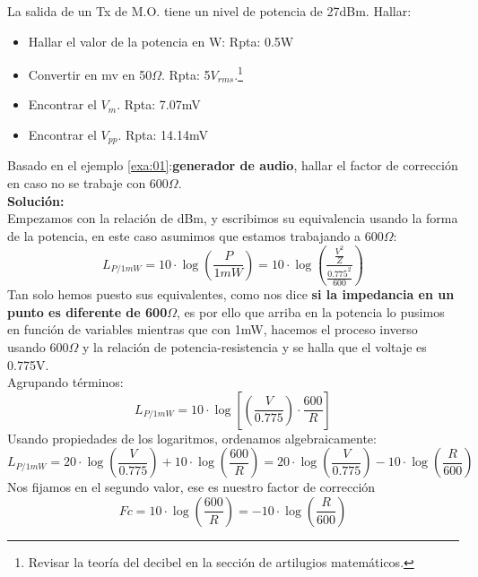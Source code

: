 \documentclass[
	12pt, %
	fleqn, %
	a4paper, %
	oneside, %
]{LegrandOrangeBook}
\begin{document}
\begin{exercise}
La salida de un Tx de M.O. tiene un nivel de potencia de 27dBm. Hallar:
\begin{itemize}
\item Hallar el valor de la potencia en W: Rpta: 0.5W
\item Convertir en mv en 50$\Omega$. Rpta: 5$V_{rms}$.\footnote{Revisar la teoría del decibel en la sección de artilugios matemáticos.}
\item Encontrar el $V_m$. Rpta: 7.07mV
\item Encontrar el $V_{pp}$. Rpta: 14.14mV
\end{itemize}
\end{exercise}
\begin{example}
Basado en el ejemplo \ref{exa:01}:\textbf{generador de audio}, hallar el factor de corrección en caso no se trabaje con 600$\Omega$.\\
\textbf{Solución:}\\
Empezamos con la relación de dBm, y escribimos su equivalencia usando la forma de la potencia, en este caso asumimos que estamos trabajando a 600$\Omega$:
\begin{displaymath}
L_{P/1mW}=10\cdot\log\left(\frac{P}{1mW}\right)=10\cdot\log\left(\frac{\frac{V^2}{Z}}{\frac{0.775^2}{600}}\right)
\end{displaymath}
Tan solo hemos puesto sus equivalentes, como nos dice \textbf{si la impedancia en un punto es diferente de 600$\Omega$}, es por ello que arriba en la potencia lo pusimos en función de variables mientras que con 1mW, hacemos el proceso inverso usando 600$\Omega$ y la relación de potencia-resistencia y se halla que el voltaje es 0.775V.\\Agrupando términos:
\begin{displaymath}
L_{P/1mW}=10\cdot\log\left[\left(\frac{V}{0.775}\right)\cdot\frac{600}{R}\right]
\end{displaymath}
Usando propiedades de los logaritmos, ordenamos algebraicamente:
\begin{displaymath}
L_{P/1mW}=20\cdot\log\left(\frac{V}{0.775}\right)+10\cdot\log\left(\frac{600}{R}\right)=20\cdot\log\left(\frac{V}{0.775}\right)-10\cdot\log\left(\frac{R}{600}\right)
\end{displaymath}
Nos fijamos en el segundo valor, ese es nuestro factor de corrección
\begin{equation*}
\boxed{Fc=10\cdot\log\left(\frac{600}{R}\right)=-10\cdot\log\left(\frac{R}{600}\right)}
\end{equation*}
\end{example}
\end{document}
